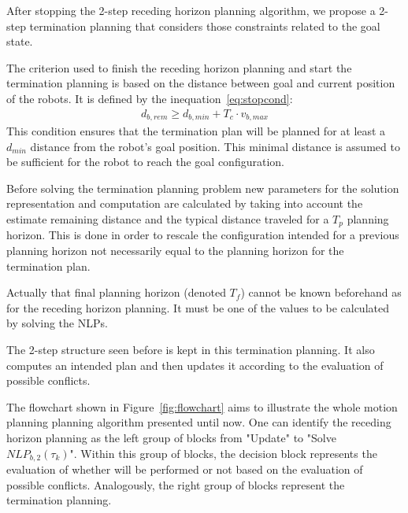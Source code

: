 
After stopping the 2-step receding horizon planning algorithm, we propose a 
2-step termination planning that considers those constraints related to
the goal state.



The criterion used to finish the receding 
horizon planning and start the termination planning is based on the distance between
goal and current position of the robots. It is defined by the inequation~\ref{eq:stopcond}:
\begin{align}\label{eq:stopcond}
  d_{b,rem} \geq d_{b,min} + T_c \cdot v_{b,max}
\end{align}
This condition ensures that the termination plan will be planned for at least a 
$d_{min}$ distance from the robot's goal position.
This minimal distance is assumed to be sufficient for the robot to reach the 
goal configuration.

Before solving the termination planning problem new parameters for 
the solution representation and computation are calculated by taking into
account the estimate remaining distance and the typical distance traveled
for a $T_p$ planning horizon.
This is done in order to rescale the configuration intended for a previous 
planning horizon not necessarily equal to the planning horizon for the termination plan.

Actually that final planning horizon (denoted $T_f$) cannot be known beforehand as for the receding horizon planning. It must be one of the values to be calculated by solving the NLPs.

The 2-step structure seen before is kept in this termination planning. It also computes an intended plan and then updates it according to the evaluation of possible conflicts.

The flowchart shown in Figure~\ref{fig:flowchart} aims to illustrate the whole motion planning planning algorithm presented until now. One can identify the receding horizon planning as the left group of blocks from "Update" to "Solve $NLP_{b,2}(\tau_k)$". Within this group of blocks, the decision block represents the evaluation of whether  will be performed or not based on the evaluation of possible conflicts. Analogously, the right group of blocks represent the termination planning.

